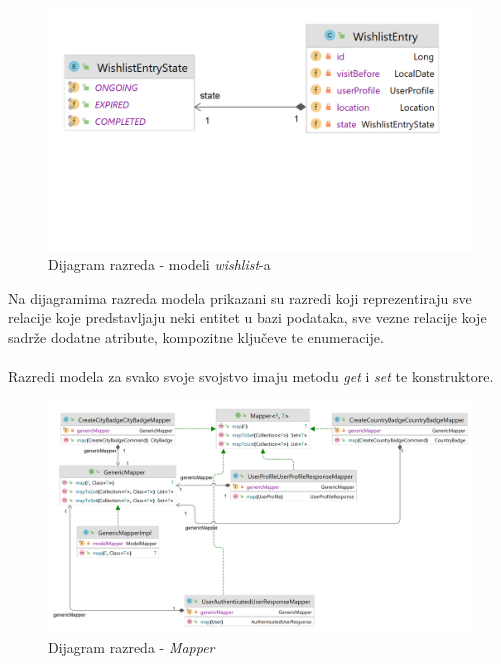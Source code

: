                 \begin{figure}[H]
        			\includegraphics[scale=0.2]{slike/class/class_model_wishlist.png}
        		\centering
        		\caption{Dijagram razreda - modeli \textit{wishlist}-a}
        	\end{figure}

                 Na dijagramima razreda modela prikazani su razredi koji reprezentiraju sve relacije koje predstavljaju neki entitet u bazi podataka, sve vezne relacije koje sadrže dodatne atribute, kompozitne ključeve te enumeracije.
                \\
                \\
                Razredi modela za svako svoje svojstvo imaju metodu \textit{get} i \textit{set} te konstruktore.
                \eject


                \begin{figure}[H]
        			\includegraphics[scale=0.2]{slike/class/class_mapper.png}
        		\centering
        		\caption{Dijagram razreda - \textit{Mapper}}
        	\end{figure}
        

